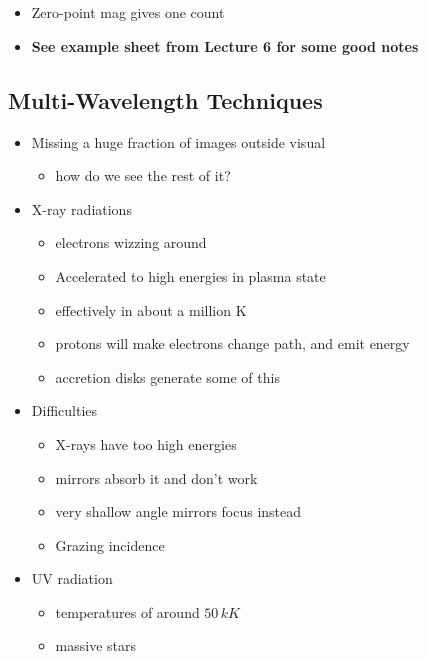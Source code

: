 \documentclass[a4paper,11pt,normalem]{article}
\begin{document}
\section{}
\begin{itemize}
    \item Zero-point mag gives one count
    \item \textbf{See example sheet from Lecture 6 for some good notes}
\end{itemize}

\subsection{Multi-Wavelength Techniques}
\begin{itemize}
    \item Missing a huge fraction of images outside visual
        \begin{itemize}
            \item how do we see the rest of it?
        \end{itemize}
    \item X-ray radiations
        \begin{itemize}
            \item electrons wizzing around
            \item Accelerated to high energies in plasma state
            \item effectively in about a million K
            \item protons will make electrons change path, and emit energy
            \item accretion disks generate some of this
        \end{itemize}
    \item Difficulties
        \begin{itemize}
            \item X-rays have too high energies
            \item mirrors absorb it and don't work
            \item very shallow angle mirrors focus instead
            \item Grazing incidence
        \end{itemize}
    \item UV radiation
        \begin{itemize}
            \item temperatures of around \(50 \, kK\)
            \item massive stars

\end{itemize}
\end{itemize}
\end{document}
